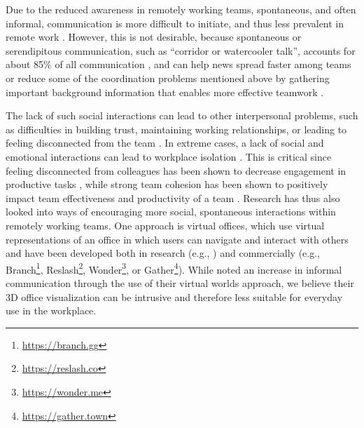 Due to the reduced awareness in remotely working teams, spontaneous, and often informal, communication is more difficult to initiate, and thus less prevalent in remote work \autocite{kraut1988patterns, sengupta2006research, herbsleb2007global, hinds2005understanding}. However, this is not desirable, because spontaneous or serendipitous communication, such as \enquote{corridor or watercooler talk}, accounts for about 85\% of all communication \autocite{kraut1990informal}, and can help news spread faster among teams \autocite{herbsleb2000distance} or reduce some of the coordination problems \autocite{herbsleb1999architectures} mentioned above by gathering important background information that enables more effective teamwork \autocite{lanubile2007collaboration, herbsleb2001global}. 

The lack of such social interactions can lead to other interpersonal problems, such as difficulties in building trust, maintaining working relationships, or leading to feeling disconnected from the team \autocite{comella2020revisiting, olson2006bridging}. In extreme cases, a lack of social and emotional interactions can lead to workplace isolation \autocite{marshall2007workplace, gorlick2020productivity, mulki2009set}. This is critical since feeling disconnected from colleagues has been shown to decrease engagement in productive tasks \autocite{lostFocus2020}, while strong team cohesion has been shown to positively impact team effectiveness and productivity of a team \autocite{carlson2017virtual}. Research has thus also looked into ways of encouraging more social, spontaneous interactions within remotely working teams. One approach is virtual offices, which use virtual representations of an office in which users can navigate and interact with others and have been developed both in research (e.g., \autocite{ lou2012presencescape}) and commercially (e.g., Branch\footnote{\url{https://branch.gg}}, Reslash\footnote{\url{https://reslash.co}}, Wonder\footnote{\url{https://wonder.me}}, or Gather\footnote{\url{https://gather.town}}). While \textcite{lou2012presencescape} noted an increase in informal communication through the use of their virtual worlds approach, we believe their 3D office visualization can be intrusive and therefore less suitable for everyday use in the workplace. 

